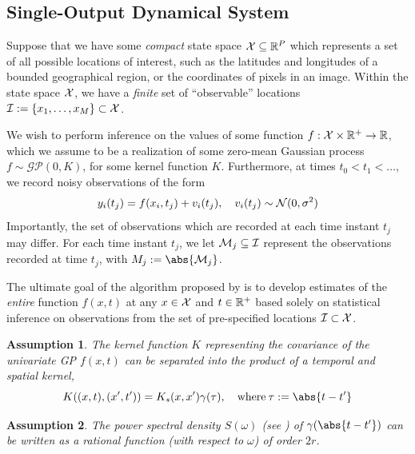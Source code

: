\documentclass[10pt]{article}
\newtheorem{assumption}{Assumption}
\newcommand{\calGP}{\mathcal{GP}}
\begin{document}
\subsection{Single-Output Dynamical System}
Suppose that we have some \emph{compact} state space $\mathcal{X} \subseteq \mathbb{R}^{P}$ which represents a set of all possible locations of interest, such as the latitudes and longitudes of a bounded geographical region, or the coordinates of pixels in an image. Within the state space $\mathcal{X}$, we have a \emph{finite} set of ``observable'' locations $\mathcal{I} := \{x_{1}, \dots, x_{M}\} \subset \mathcal{X}$.

We wish to perform inference on the values of some function $f: \mathcal{X} \times \mathbb{R}^{+} \to \mathbb{R}$, which we assume to be a realization of some zero-mean Gaussian process $f \sim \calGP(0, K)$, for some kernel function $K$. Furthermore, at times $t_{0} < t_{1} < \dots$, we record noisy observations of the form 
\begin{equation}
    y_{i}(t_{j}) = f(x_{i}, t_{j}) + v_{i}(t_{j}), \quad v_{i}(t_{j}) \sim \mathcal{N}(0, \sigma^{2}) 
\end{equation}
Importantly, the set of observations which are recorded at each time instant $t_{j}$ may differ. For each time instant $t_{j}$, we let $\mathcal{M}_{j} \subseteq \mathcal{I}$ represent the observations recorded at time $t_{j}$, with $M_{j} := \abs{\calM_{j}}$. 

The ultimate goal of the algorithm proposed by \citeauthor{Todescato-Efficient-2020} is to develop estimates of the \emph{entire} function $f(x, t)$ at any $x \in \mathcal{X}$ and $t \in \mathbb{R}^{+}$ based solely on statistical inference on observations from the set of pre-specified locations $\mathcal{I} \subset \mathcal{X}$.

\begin{assumption}
\label{ass:todescato-kernel-sep}
    The kernel function $K$ representing the covariance of the univariate GP $f(x, t)$ can be separated into the product of a temporal and spatial kernel,
    \begin{equation}
    \label{eq:GP-kernel-sep}
        K((x, t), (x', t')) = K_{s}(x, x')\gamma(\tau), \quad \textrm{where}\: \tau := \abs{t - t'}
    \end{equation}
\end{assumption}

\begin{assumption}
\label{ass:todescato-psd-order}
    The power spectral density $S(\omega)$ (see ) of $\gamma(\abs{t - t'})$ can be written as a rational function (with respect to $\omega$) of order $2r$. 
\end{assumption}
\end{document}
